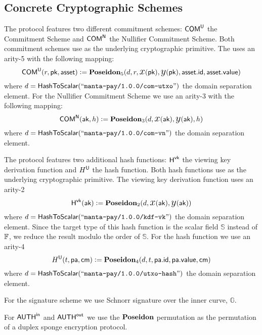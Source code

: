 \subsection{Concrete Cryptographic Schemes}

\begin{definition}
    The protocol features two different commitment schemes: ${\textsf{COM}}^{{\textsf{U}}}$ the \UTXO{} Commitment Scheme and ${\textsf{COM}}^{{\textsf{N}}}$ the Nullifier Commitment Scheme. Both commitment schemes use \Poseidon{} as the underlying cryptographic primitive. The \UTXO{} uses an arity-5 \Poseidon{} with the following mapping:
    \[{\textsf{COM}}^{{\textsf{U}}}(r, {\textsf{pk}}, {\textsf{asset}}) := {\textbf{Poseidon}}_5(d, r, {\text{\Large $x$}}({\textsf{pk}}), {\text{\Large $y$}}({\textsf{pk}}), {\textsf{asset}}.{\textsf{id}}, {\textsf{asset}}.{\textsf{value}})\]
    where $d = {\textsf{HashToScalar}}({``\texttt{manta-pay/1.0.0/com-utxo}"})$ the domain separation element.
    For the Nullifier Commitment Scheme we use an arity-3 \Poseidon{} with the following mapping:
    \[{\textsf{COM}}^{{\textsf{N}}}({\textsf{ak}}, h) := {\textbf{Poseidon}}_3(d, {\text{\Large $x$}}({\textsf{ak}}), {\text{\Large $y$}}({\textsf{ak}}), h)\]
    where $d = {\textsf{HashToScalar}}({``\texttt{manta-pay/1.0.0/com-vn}"})$ the domain separation element.
\end{definition}

\begin{definition}
    The protocol features two additional hash functions: ${\textsf{H}}^{{\textsf{vk}}}$ the viewing key derivation function and $H^{{\textsf{U}}}$ the \UTXO{} hash function. Both hash functions use \Poseidon{} as the underlying cryptographic primitive. The viewing key derivation function uses an arity-2 \Poseidon{}
    \[{\textsf{H}}^{{\textsf{vk}}}({\textsf{ak}}) := {\textbf{Poseidon}}_2(d, {\text{\Large $x$}}({\textsf{ak}}), {\text{\Large $y$}}({\textsf{ak}}))\]
    where $d = {\textsf{HashToScalar}}({``\texttt{manta-pay/1.0.0/kdf-vk}"})$ the domain separation element. Since the target type of this hash function is the scalar field $\mathbb{S}$ instead of ${\mathbb{F}}$, we reduce the result modulo the order of $\mathbb{S}$.
    For the \UTXO{} hash function we use an arity-4 \Poseidon{}
    \[H^{{\textsf{U}}}(t, {\textsf{pa}}, {\textsf{cm}}) := {\textbf{Poseidon}}_4(d, t, {\textsf{pa}}.{\textsf{id}}, {\textsf{pa}}.{\textsf{value}}, {\textsf{cm}})\]
    where $d = {\textsf{HashToScalar}}({``\texttt{manta-pay/1.0.0/utxo-hash}"})$ the domain separation element.
\end{definition}

\begin{definition}
    For the signature scheme we use Schnorr signature over the inner curve, $\mathbb{G}$.
\end{definition}

\begin{definition}
    For ${{\textsf{AUTH}}^\textsf{in}}$ and ${{\textsf{AUTH}}^\textsf{out}}$ we use the ${\textbf{Poseidon}}$ permutation as the permutation of a duplex sponge encryption protocol.
\end{definition}

